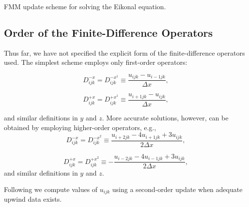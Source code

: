 		\begin{algorithm}
			\SetAlgoLined
			\caption{FMM update scheme for solving the Eikonal equation.}
			\label{alg:fmm_update}
		\end{algorithm}

		

	\subsection{Order of the Finite-Difference Operators}
		Thus far, we have not specified the explicit form of the finite-difference operators used. The simplest scheme employs only first-order operators:
		
		\begin{equation}
			D^{-x}_{ijk} = D^{-x^1}_{ijk} \equiv \frac{u_{ijk}-u_{i-1jk}}{\Delta x},
		\end{equation}
		
		\begin{equation}
			D^{+x}_{ijk} = D^{+x^1}_{ijk} \equiv \frac{u_{i+1jk}-u_{ijk}}{\Delta x},
		\end{equation}
		
		\noindent and similar definitions in $y$ and $z$. More accurate solutions, however, can be obtained by employing higher-order operators, e.g.,
		\begin{equation}
			D^{-x}_{ijk} = D^{-x^2}_{ijk} \equiv \frac{u_{i+2jk}-4u_{i+1jk}+3u_{ijk}}{2\Delta x},
		\end{equation}
		
		\begin{equation}
			D^{+x}_{ijk} = D^{+x^2}_{ijk} \equiv -\frac{u_{i-2jk}-4u_{i-1jk}+3u_{ijk}}{2\Delta x},
		\end{equation}
		and similar definitions in $y$ and $z$.
		
		Following  we compute values of $u_{ijk}$ using a second-order update when adequate upwind data exists.